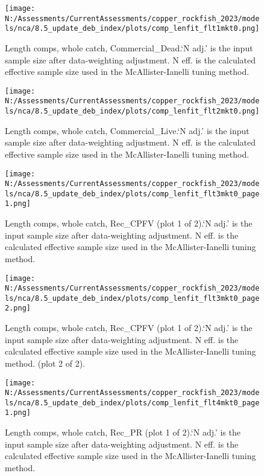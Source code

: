 \documentclass[11pt,
  english,
  letterpaper,
]{article}
\begin{document}
\begin{figure}
\centering
\texttt{[image: N:/Assessments/CurrentAssessments/copper\_rockfish\_2023/models/nca/8.5\_update\_deb\_index/plots/comp\_lenfit\_flt1mkt0.png]}
\caption{Length comps, whole catch, Commercial\_Dead.`N adj.' is the input sample size after data-weighting adjustment. N eff. is the calculated effective sample size used in the McAllister-Ianelli tuning method.\label{fig:comp_lenfit_flt1mkt0}}
\end{figure}

\begin{figure}
\centering
\texttt{[image: N:/Assessments/CurrentAssessments/copper\_rockfish\_2023/models/nca/8.5\_update\_deb\_index/plots/comp\_lenfit\_flt2mkt0.png]}
\caption{Length comps, whole catch, Commercial\_Live.`N adj.' is the input sample size after data-weighting adjustment. N eff. is the calculated effective sample size used in the McAllister-Ianelli tuning method.\label{fig:comp_lenfit_flt2mkt0}}
\end{figure}

\begin{figure}
\centering
\texttt{[image: N:/Assessments/CurrentAssessments/copper\_rockfish\_2023/models/nca/8.5\_update\_deb\_index/plots/comp\_lenfit\_flt3mkt0\_page1.png]}
\caption{Length comps, whole catch, Rec\_CPFV (plot 1 of 2).`N adj.' is the input sample size after data-weighting adjustment. N eff. is the calculated effective sample size used in the McAllister-Ianelli tuning method.\label{fig:comp_lenfit_flt3mkt0_page1}}
\end{figure}

\begin{figure}
\centering
\texttt{[image: N:/Assessments/CurrentAssessments/copper\_rockfish\_2023/models/nca/8.5\_update\_deb\_index/plots/comp\_lenfit\_flt3mkt0\_page2.png]}
\caption{Length comps, whole catch, Rec\_CPFV (plot 1 of 2).`N adj.' is the input sample size after data-weighting adjustment. N eff. is the calculated effective sample size used in the McAllister-Ianelli tuning method. (plot 2 of 2).\label{fig:comp_lenfit_flt3mkt0_page2}}
\end{figure}

\begin{figure}
\centering
\texttt{[image: N:/Assessments/CurrentAssessments/copper\_rockfish\_2023/models/nca/8.5\_update\_deb\_index/plots/comp\_lenfit\_flt4mkt0\_page1.png]}
\caption{Length comps, whole catch, Rec\_PR (plot 1 of 2).`N adj.' is the input sample size after data-weighting adjustment. N eff. is the calculated effective sample size used in the McAllister-Ianelli tuning method.\label{fig:comp_lenfit_flt4mkt0_page1}}
\end{figure}
\end{document}

